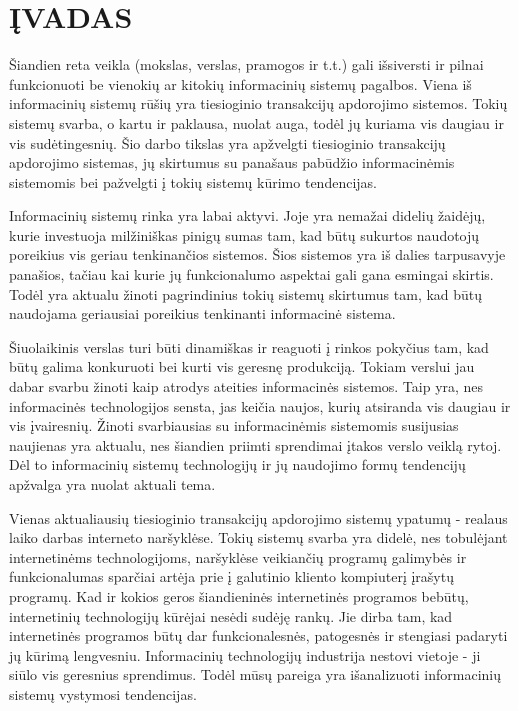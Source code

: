 \documentclass[12pt,a4paper,titlepage]{article}
\begin{document}

\let \savenumberline \numberline
\def \numberline#1{\savenumberline{#1.}}
\tableofcontents
\newpage

\begin{comment}
Įvade apibūdinamas darbo tikslas, temos aktualumas ir siekiami rezultatai. Darbo įvadas neturi būti dėstymo santrauka. Įvado apimtis 1–2 puslapiai.
\end{comment}

\section*{ĮVADAS}

Šiandien reta veikla (mokslas, verslas, pramogos ir t.t.) gali išsiversti ir pilnai funkcionuoti be vienokių ar kitokių informacinių sistemų pagalbos. Viena iš informacinių sistemų rūšių yra tiesioginio transakcijų apdorojimo sistemos. Tokių sistemų svarba, o kartu ir paklausa, nuolat auga, todėl jų kuriama vis daugiau ir vis sudėtingesnių. Šio darbo tikslas yra apžvelgti tiesioginio transakcijų apdorojimo sistemas, jų skirtumus su panašaus pabūdžio informacinėmis sistemomis bei pažvelgti į tokių sistemų kūrimo tendencijas.

Informacinių sistemų rinka yra labai aktyvi. Joje yra nemažai didelių žaidėjų, kurie investuoja milžiniškas pinigų sumas tam, kad būtų sukurtos naudotojų poreikius vis geriau tenkinančios sistemos. Šios sistemos yra iš dalies tarpusavyje panašios, tačiau kai kurie jų funkcionalumo aspektai gali gana esmingai skirtis. Todėl yra aktualu žinoti pagrindinius tokių sistemų skirtumus tam, kad būtų naudojama geriausiai poreikius tenkinanti informacinė sistema.

Šiuolaikinis verslas turi būti dinamiškas ir reaguoti į rinkos pokyčius tam, kad būtų galima konkuruoti bei kurti vis geresnę produkciją. Tokiam verslui jau dabar svarbu žinoti kaip atrodys ateities informacinės sistemos. Taip yra, nes informacinės technologijos sensta, jas keičia naujos, kurių atsiranda vis daugiau ir vis įvairesnių. Žinoti svarbiausias su informacinėmis sistemomis susijusias naujienas yra aktualu, nes šiandien priimti sprendimai įtakos verslo veiklą rytoj. Dėl to informacinių sistemų technologijų ir jų naudojimo formų tendencijų apžvalga yra nuolat aktuali tema.

Vienas aktualiausių tiesioginio transakcijų apdorojimo sistemų ypatumų - realaus laiko darbas interneto naršyklėse. Tokių sistemų svarba yra didelė, nes tobulėjant internetinėms technologijoms, naršyklėse veikiančių programų galimybės ir funkcionalumas sparčiai artėja prie į galutinio kliento kompiuterį įrašytų programų. Kad ir kokios geros šiandieninės internetinės programos bebūtų, internetinių technologijų kūrėjai nesėdi sudėję rankų. Jie dirba tam, kad internetinės programos būtų dar funkcionalesnės, patogesnės ir stengiasi padaryti jų kūrimą lengvesniu. Informacinių technologijų industrija nestovi vietoje - ji siūlo vis geresnius sprendimus. Todėl mūsų pareiga yra išanalizuoti informacinių sistemų vystymosi tendencijas.
\end{document}
